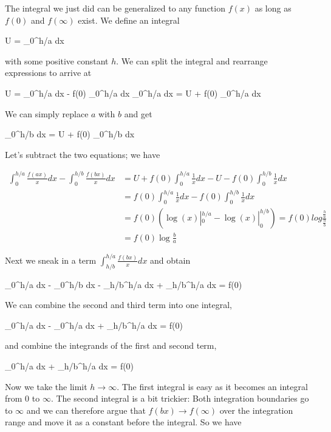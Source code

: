 The integral we just did can be generalized to any function $f(x)$ as long as $f(0)$ and $f(\infty)$ exist. We define an integral

\bee
U = \int_0^{h/a}  dx
\eee

with some positive constant $h$. We can split the integral and rearrange expressions to arrive at

\bee
U = \int_0^{h/a}  dx - f(0) \int_0^{h/a}  dx \rightarrow \int_0^{h/a}  dx = U + f(0) \int_0^{h/a}  dx
\eee

We can simply replace $a$ with $b$ and get

\bee
\int_0^{h/b}  dx = U + f(0) \int_0^{h/b}  dx
\eee

Let's subtract the two equations; we have

\begin{align*}
  \int_0^{h/a} \frac{f(ax)}{x} dx - \int_0^{h/b} \frac{f(bx)}{x} dx &= U + f(0) \int_0^{h/a} \frac{1}{x} dx - U - f(0) \int_0^{h/b} \frac{1}{x} dx \\
                                                                    &= f(0) \int_0^{h/a} \frac{1}{x} dx - f(0) \int_0^{h/b} \frac{1}{x} dx \\
                                                                    &= f(0) \left( \log(x)|_0^{h/a} - \log(x)|_0^{h/b} \right) = f(0) log \frac{\frac{h}{a}}{\frac{h}{b}} \\
                                                                    &= f(0) \log \frac{b}{a}
\end{align*}

Next we sneak in a term $\int_{h/b}^{h/a} \frac{f(bx)}{x} dx$ and obtain

\bee
\int_0^{h/a}  dx - \int_0^{h/b}  dx - \int_{h/b}^{h/a}  dx + \int_{h/b}^{h/a}  dx = f(0) \log {}
\eee

We can combine the second and third term into one integral,

\bee
\int_0^{h/a}  dx - \int_0^{h/a}  dx + \int_{h/b}^{h/a}  dx = f(0) \log {}
\eee

and combine the integrands of the first and second term,

\bee
\int_0^{h/a}  dx + \int_{h/b}^{h/a}  dx = f(0) \log {}
\eee

Now we take the limit $h \rightarrow \infty$. The first integral is easy as it becomes an integral from $0$ to $\infty$. The second integral is a bit trickier: Both integration boundaries
go to $\infty$ and we can therefore argue that $f(bx) \rightarrow f(\infty)$ over the integration range and move it as a constant before the integral. So we have

